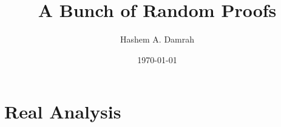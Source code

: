 \documentclass{book}
\title{A Bunch of Random Proofs}
\author{Hashem A. Damrah}
\date{\today}
\begin{document}
  \pagestyle{empty}
  \maketitle
  \newpage
  \tableofcontents
  \newpage

  \pagestyle{fancy}











  \chapter{Real Analysis}
  
\end{document}
